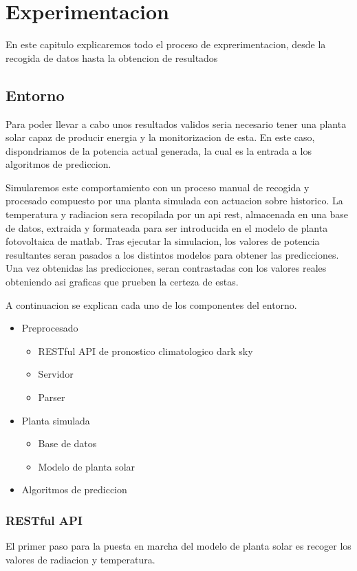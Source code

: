 \chapter{Experimentacion}

En este capitulo explicaremos todo el proceso de exprerimentacion, desde la recogida de datos hasta la obtencion de resultados


\section{Entorno}
Para poder llevar a cabo unos resultados validos seria necesario tener una planta solar capaz de producir energia y la monitorizacion de esta. En este caso, dispondriamos de la potencia actual generada, la cual es la entrada a los algoritmos de prediccion.

Simularemos este comportamiento con un proceso manual de recogida y procesado compuesto por una planta simulada con actuacion sobre historico.
La temperatura y radiacion sera recopilada por un api rest, almacenada en una base de datos, extraida y formateada para ser introducida en el modelo de planta fotovoltaica de matlab.
Tras ejecutar la simulacion, los valores de potencia resultantes seran pasados a los distintos modelos para obtener las predicciones.
Una vez obtenidas las predicciones, seran contrastadas con los valores reales obteniendo asi graficas que prueben la certeza de estas.

A continuacion se explican cada uno de los componentes del entorno.

\begin{itemize}
    \item Preprocesado
    \begin{itemize}
        \item RESTful API de pronostico climatologico dark sky
        \item Servidor
        \item Parser
    \end{itemize}
    \item Planta simulada
    \begin{itemize}
        \item Base de datos
        \item Modelo de planta solar
    \end{itemize}
    \item Algoritmos de prediccion
\end{itemize}


\subsection{RESTful API} %
\label{sub:API}
El primer paso para la puesta en marcha del modelo de planta solar es recoger los valores de radiacion y temperatura.

